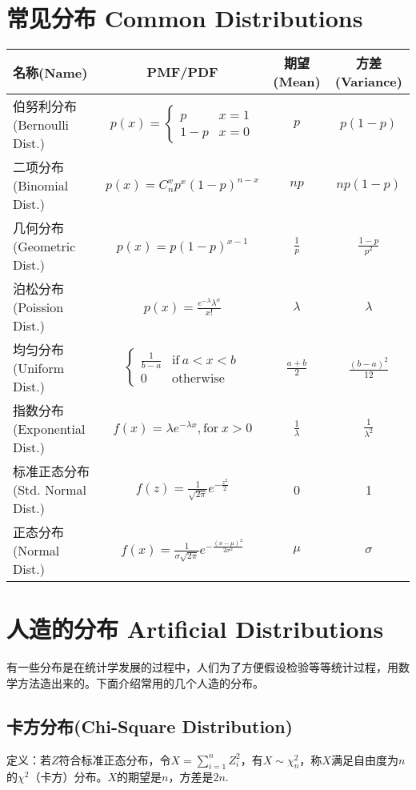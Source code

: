 \documentclass[UTF8]{ctexbook}
\begin{document}
\section{常见分布 Common Distributions}
\renewcommand{\arraystretch}{2.1}
\begin{center}
    \begin{tabular}{|l|c|c|c|}
\hline\hline
     名称(Name)&PMF/PDF&期望(Mean)&方差(Variance) \\ \hline
     伯努利分布(Bernoulli Dist.)& $p(x)=\begin{cases} p &x=1 \\ 1-p &x=0 \end{cases}$& $p$& $p(1-p)$ \\ \hline
     二项分布(Binomial Dist.)& $p(x)=C_n^xp^x(1-p)^{n-x}$& $np$& $np(1-p)$ \\ \hline
     几何分布(Geometric Dist.)& $p(x)=p(1-p)^{x-1}$& $\frac{1}{p}$& $\frac{1-p}{p^2}$ \\ \hline
     泊松分布(Poission Dist.)& $p(x)=\frac{e^{-\lambda}\lambda^x}{x!}$& $\lambda$& $\lambda$ \\ \hline
     均匀分布(Uniform Dist.)& $\begin{cases} \frac{1}{b-a} &\text{if}\ a<x<b \\ 0 &\text{otherwise} \end{cases}$& $\frac{a+b}{2}$& $\frac{(b-a)^2}{12}$ \\ \hline
     指数分布(Exponential Dist.)& $f(x)=\lambda e^{-\lambda x}, \text{for}\ x>0$& $\frac{1}{\lambda}$& $\frac{1}{\lambda^2}$ \\ \hline
     标准正态分布(Std. Normal Dist.)& $f(z)=\frac{1}{\sqrt{2\pi}}e^{-\frac{z^2}{2}}$& 0& 1\\ \hline
     正态分布(Normal Dist.)&$f(x)=\frac{1}{\sigma\sqrt{2\pi}}e^{-\frac{(x-\mu)^2}{2\sigma^2}}$& $\mu$& $\sigma$\\ \hline
\hline
\end{tabular}
\end{center}
\renewcommand{\arraystretch}{1}
\section{人造的分布 Artificial Distributions}
有一些分布是在统计学发展的过程中，人们为了方便假设检验等等统计过程，用数学方法造出来的。下面介绍常用的几个人造的分布。
\subsection{卡方分布(Chi-Square Distribution)}
\label{chi-square definition}
定义：若$Z$符合标准正态分布，令$X=\sum_{i=1}^nZ_i^2$，有$X\sim \chi^2_n$，称$X$满足自由度为$n$的$\chi^2$（卡方）分布。$X$的期望是$n$，方差是$2n$.
\end{document}
